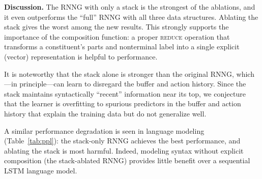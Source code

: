 \documentclass[11pt]{article}
\newcommand{\ask}[1]{\textcolor{orange}{{\textbf{[#1 --\textsc{ask}]}}}}
\newcommand{\lpk}[1]{\textcolor{green}{{\textbf{[#1 --\textsc{lpk}]}}}}
\newcommand{\cjd}[1]{\textcolor{cyan}{{\textbf{[#1 --\textsc{cjd}]}}}}
\newcommand{\nascomment}[1]{\textcolor{blue}{{\textbf{[#1 --\textsc{nas}]}}}}
\newcommand{\miguelcomment}[1]{\textcolor{red}{{\textbf{[#1 --\textsc{miguel}]}}}}
\renewcommand{\ask}[1]{}
\renewcommand{\lpk}[1]{}
\renewcommand{\cjd}[1]{}
\renewcommand{\nascomment}[1]{}
\renewcommand{\miguelcomment}[1]{}
\begin{document}
\textbf{Discussion.}
The RNNG with only a stack is the strongest of the ablations, and it even outperforms the ``full'' RNNG with all three data structures.  Ablating the stack gives the worst among the new results.  This strongly supports the importance of the composition function:  a proper \textsc{reduce} operation that transforms a constituent's parts and nonterminal label into a single explicit (vector) representation is helpful to performance.

It is noteworthy that the stack alone is stronger than the original RNNG, which---in principle---can learn to disregard the buffer and action history.  Since the stack maintains syntactically ``recent'' information near its top, we conjecture that the learner is overfitting to spurious predictors in the buffer and action history that explain the training data but do not generalize well.

A similar performance degradation is seen in language modeling (Table~\ref{tab:ppl}):  the stack-only RNNG achieves the best performance, and ablating the stack is most harmful.  Indeed, modeling syntax without explicit composition (the stack-ablated RNNG) provides little benefit over a sequential LSTM language model.

\end{document}
